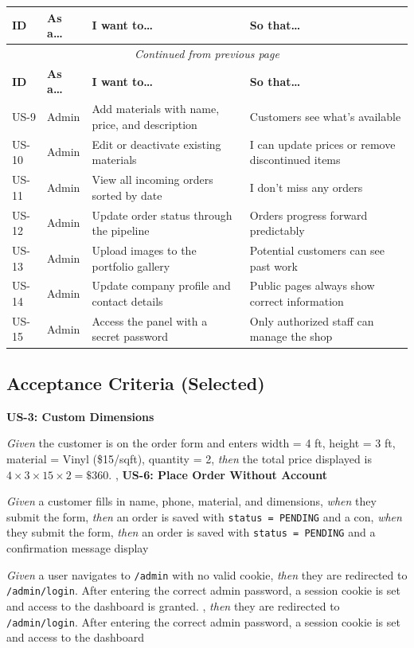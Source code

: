 \documentclass[12pt, a4paper]{article}
\begin{document}
\begin{longtable}{p{1cm} p{2.5cm} p{4.5cm} p{4cm}}
\toprule
\textbf{ID} & \textbf{As a\ldots} & \textbf{I want to\ldots} & \textbf{So that\ldots} \\
\midrule
\endfirsthead
\multicolumn{4}{c}{\textit{Continued from previous page}}\\
\toprule
\textbf{ID} & \textbf{As a\ldots} & \textbf{I want to\ldots} & \textbf{So that\ldots} \\
\midrule
\endhead
\bottomrule
\endlastfoot
US-9  & Admin & Add materials with name, price, and description & Customers see what's available \\
US-10 & Admin & Edit or deactivate existing materials & I can update prices or remove discontinued items \\
US-11 & Admin & View all incoming orders sorted by date & I don't miss any orders \\
US-12 & Admin & Update order status through the pipeline & Orders progress forward predictably \\
US-13 & Admin & Upload images to the portfolio gallery & Potential customers can see past work \\
US-14 & Admin & Update company profile and contact details & Public pages always show correct information \\
US-15 & Admin & Access the panel with a secret password & Only authorized staff can manage the shop \\
\end{longtable}

\subsection{Acceptance Criteria (Selected)}

\textbf{US-3: Custom Dimensions}

\textit{Given} the customer is on the order form and enters width = 4 ft, height = 3 ft, material = Vinyl (\$15/sqft), quantity = 2,
\textit{then} the total price displayed is $4 \times 3 \times 15 \times 2 = \$360$.
,
\textbf{US-6: Place Order Without Account}

\textit{Given} a customer fills in name, phone, material, and dimensions,
\textit{when} they submit the form,
\textit{then} an order is saved with \texttt{status = PENDING} and a con,
\textit{when} they submit the form,
\textit{then} an order is saved with \texttt{status = PENDING} and a confirmation message display

\textit{Given} a user navigates to \texttt{/admin} with no valid cookie,
\textit{then} they are redirected to \texttt{/admin/login}. After entering the correct admin password, a session cookie is set and access to the dashboard is granted.
,
\textit{then} they are redirected to \texttt{/admin/login}. After entering the correct admin password, a session cookie is set and access to the dashboard
\end{document}
